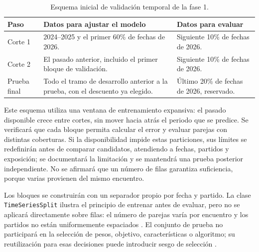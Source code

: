 \begin{table}[htbp]
\centering
\small
\caption{Esquema inicial de validación temporal de la fase 1.}
\label{tab:validacion-temporal-fase1}
\begin{tabularx}{\textwidth}{@{}p{2.0cm}XX@{}}
\toprule
\textbf{Paso} & \textbf{Datos para ajustar el modelo} & \textbf{Datos para evaluar}\\
\midrule
Corte 1 & 2024--2025 y el primer 60\% de fechas de 2026. & Siguiente 10\% de fechas de 2026.\\
Corte 2 & El pasado anterior, incluido el primer bloque de validación. & Siguiente 10\% de fechas de 2026.\\
Prueba final & Todo el tramo de desarrollo anterior a la prueba, con el descuento ya elegido. & Último 20\% de fechas de 2026, reservado.\\
\bottomrule
\end{tabularx}
\end{table}

Este esquema utiliza una ventana de entrenamiento expansiva: el pasado disponible crece entre cortes, sin mover hacia atrás el periodo que se predice. Se verificará que cada bloque permita calcular el error y evaluar parejas con distintas coberturas. Si la disponibilidad impide estas particiones, sus límites se redefinirán antes de comparar candidatos, atendiendo a fechas, partidos y exposición; se documentará la limitación y se mantendrá una prueba posterior independiente. No se afirmará que un número de filas garantiza suficiencia, porque varias provienen del mismo encuentro.

Los bloques se construirán con un separador propio por fecha y partido. La clase \texttt{TimeSeriesSplit} ilustra el principio de entrenar antes de evaluar, pero no se aplicará directamente sobre filas: el número de parejas varía por encuentro y los partidos no están uniformemente espaciados \cite{sklearnTemporal613}. El conjunto de prueba no participará en la selección de pesos, objetivo, características o algoritmo; su reutilización para esas decisiones puede introducir sesgo de selección \cite{cawley2010selection}.

